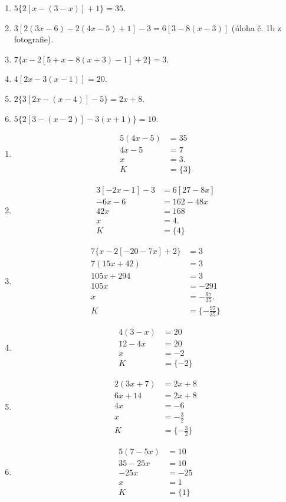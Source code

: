 \documentclass[11pt,a4paper]{article}
\begin{document}
\begin{zadaniReseniBox}[title={Domácí úkol}]
\begin{enumerate}[label=\alph*)]
\item
$5\{2[x-(3-x)]+1\}=35$.
\item
$3[2(3x-6)-2(4x-5)+1]-3=6[3-8(x-3)]$ (úloha č. 1b z fotografie).
\item
$7\{x-2[5+x-8(x+3)-1]+2\}=3$.
\item
$4[2x-3(x-1)]=20$.
\item
$2\{3[2x-(x-4)]-5\}=2x+8$.
\item
$5\{2[3-(x-2)]-3(x+1)\}=10$.
\end{enumerate}
\tcblower
\begin{enumerate}[label=\alph*)]
\item
\[
\begin{aligned}5(4x-5)&=35\\4x-5&=7\\x&=3. \\[2mm]
K &= \{3\}
\end{aligned}
\]
\item
\[
\begin{aligned}3[-2x-1]-3&=6[27-8x]\\-6x-6&=162-48x\\42x&=168\\x&=4. \\[2mm]
K &= \{4\}
\end{aligned}
\]
\item
\[
\begin{aligned}7\{x-2[-20-7x]+2\}&=3\\7(15x+42)&=3\\105x+294&=3\\105x&=-291\\x&=-\tfrac{97}{35}. \\[2mm]
K &= \{-\tfrac{97}{35}\}
\end{aligned}
\]
\item
\[
\begin{aligned}
4(3-x)&=20\\12-4x&=20\\x&=-2 \\[2mm]
K &= \{-2\}
\end{aligned}
\]
\item
\[
\begin{aligned}
2(3x+7)&=2x+8\\6x+14&=2x+8\\4x&=-6\\x&=-\frac32 \\[2mm]
K &= \{-\frac32\}
\end{aligned}
\]
\item
\[
\begin{aligned}
5(7-5x)&=10\\35-25x&=10\\-25x&=-25\\x&=1 \\[2mm]
K &= \{1\}
\end{aligned}
\]
\end{enumerate}
\end{zadaniReseniBox}
\end{document}
